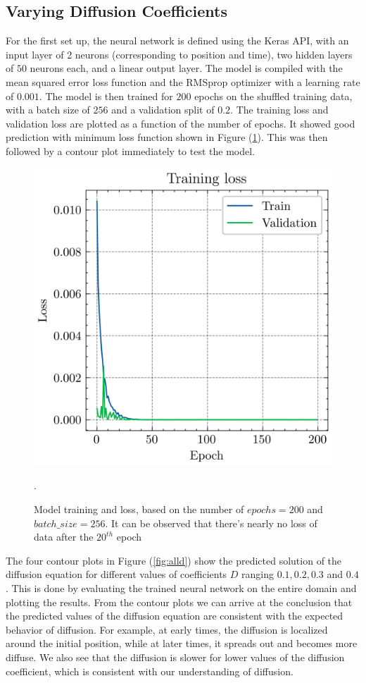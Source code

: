 \subsection{Varying Diffusion Coefficients}
For the first set up, the neural network is defined using the Keras API, with an input layer of 2 neurons (corresponding to position and time), two hidden layers of $50$ neurons each, and a linear output layer. The model is compiled with the mean squared error loss function and the RMSprop optimizer with a learning rate of $0.001$. The model is then trained for $200$ epochs on the shuffled training data, with a batch size of $256$ and a validation split of $0.2$. The training loss and validation loss are plotted as a function of the number of epochs. It showed good prediction with minimum loss function shown in Figure (\ref{fig:tls}). This was then followed by a contour plot immediately to test the model.

\begin{figure}[htb!]
\includegraphics[width=.49\textwidth]{images/train_loss.png}
\vspace*{-8mm}
\caption{Model training and loss, based on the number of $epochs=200$ and $batch\_size=256$. It can be observed that there's nearly no loss of data after the $20^{th}$ epoch}.
\label{fig:tls}
\end{figure}

The four contour plots in Figure (\ref{fig:alld}) show the predicted solution of the diffusion equation for different values of coefficients $D$ ranging $0.1 , 0.2, 0.3$ and $0.4$. This is done  by evaluating the trained neural network on the entire domain and plotting the results. From the contour plots we can arrive at the conclusion that the predicted values of the diffusion equation are consistent with the expected behavior of diffusion. For example, at early times, the diffusion is localized around the initial position, while at later times, it spreads out and becomes more diffuse. We also see that the diffusion is slower for lower values of the diffusion coefficient, which is consistent with our understanding of diffusion.

